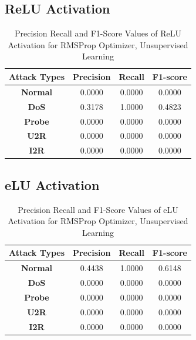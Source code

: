 \documentclass[12pt, a4paper]{report}
\begin{document}
\begin{appendices}
  
  \subsection{ReLU Activation}
  \begin{table}[h]
		\centering
		\captionsetup{justification=centering,margin=2cm}
		\begin{tabular}{|c|c|c|c|}
		\hline
		\textbf{Attack Types} & \textbf{Precision} & \textbf{Recall} & \textbf{F1-score} \\ \hline
		\textbf{Normal}       & 0.0000             & 0.0000          & 0.0000            \\ \hline
		\textbf{DoS}          & 0.3178             & 1.0000          & 0.4823            \\ \hline
		\textbf{Probe}        & 0.0000             & 0.0000          & 0.0000            \\ \hline
		\textbf{U2R}          & 0.0000             & 0.0000          & 0.0000            \\ \hline
		\textbf{I2R}          & 0.0000             & 0.0000          & 0.0000            \\ \hline
		\end{tabular}
		\caption{Precision Recall and F1-Score Values of ReLU Activation for RMSProp Optimizer, Unsupervised Learning}
		\label{classification ReLU RMSProp tf}
		\end{table} 

   \subsection{eLU Activation}
  \begin{table}[h]
		\centering
		\captionsetup{justification=centering,margin=2cm}
		\begin{tabular}{|c|c|c|c|}
		\hline
		\textbf{Attack Types} & \textbf{Precision} & \textbf{Recall} & \textbf{F1-score} \\ \hline
		\textbf{Normal}       & 0.4438             & 1.0000          & 0.6148            \\ \hline
		\textbf{DoS}          & 0.0000             & 0.0000          & 0.0000            \\ \hline
		\textbf{Probe}        & 0.0000             & 0.0000          & 0.0000            \\ \hline
		\textbf{U2R}          & 0.0000             & 0.0000          & 0.0000            \\ \hline
		\textbf{I2R}          & 0.0000             & 0.0000          & 0.0000            \\ \hline
		\end{tabular}
		\caption{Precision Recall and F1-Score Values of eLU Activation for RMSProp Optimizer, Unsupervised Learning}
		\label{classification eLU RMSProp tf}
		\end{table} 
  \clearpage

\end{appendices}
\end{document}
